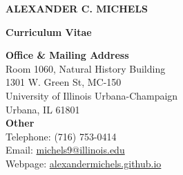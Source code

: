 \documentclass{acmcv}
\begin{document}
\begin{center}
    \fontsize{14}{16}\textbf{\uppercase{Alexander C. Michels}}\\
    \vspace*{.5cm}


    \fontsize{12}{14}\textbf{Curriculum Vitae}
    \vspace*{.25cm}
\end{center}


\begin{multicols}{2}
    \textbf{Office \& Mailing Address}\\
    Room 1060, Natural History Building\\
    1301 W. Green St, MC-150\\
    University of Illinois Urbana-Champaign\\
    Urbana, IL 61801\\
    
    \textbf{Other}\\
    Telephone: (716) 753-0414\\
    Email: \href{mailto:michels9@illinois.edu}{michels9@illinois.edu}\\
    Webpage: \href{http://alexandermichels.github.io}{alexandermichels.github.io}
    
\end{multicols}


	
\end{document}
